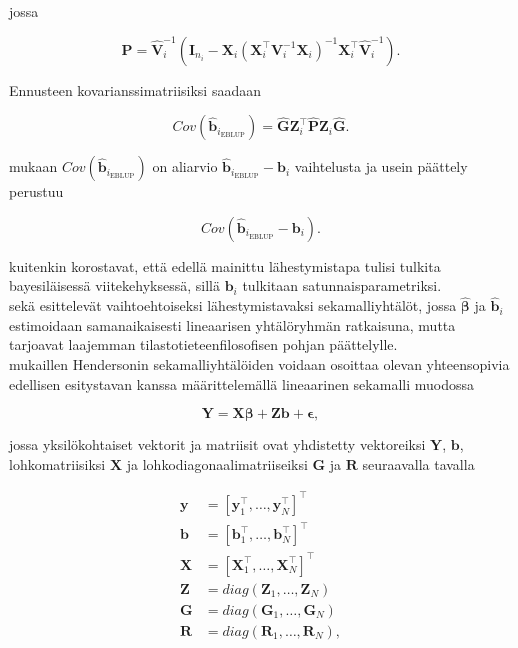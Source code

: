 \documentclass[finnish]{docopts}
\begin{document}
jossa 

$$
\hat{\bm{P}} = \hat{\bm{V}}_{i}^{-1}(\bm{I}_{n_i} - \bm{X}_{i} (\bm{X}_{i}^\top \bm{V}_{i}^{-1} \bm{X}_{i})^{-1} \bm{X}_{i}^\top \hat{\bm{V}}_{i}^{-1}).
$$

Ennusteen kovarianssimatriisiksi saadaan

$$
Cov(\hat{\bm{b}}_{i_\text{EBLUP}}) = \hat{\bm{G}} \bm{Z}_{i}^\top \hat{\bm{P}} \bm{Z}_{i} \hat{\bm{G}}.
$$

\cite{verbeke00} mukaan $Cov(\hat{\bm{b}}_{i_\text{EBLUP}})$ on aliarvio $\hat{\bm{b}}_{i_\text{EBLUP}} - \bm{b}_{i}$ vaihtelusta ja usein päättely perustuu

$$
Cov(\hat{\bm{b}}_{i_\text{EBLUP}} - \bm{b}_{i}).
$$

\cite{verbeke00} kuitenkin korostavat, että edellä mainittu lähestymistapa tulisi tulkita bayesiläisessä viitekehyksessä, sillä $\bm{b}_{i}$ tulkitaan satunnaisparametriksi. \\

\cite{nissinen09} sekä \cite{verbeke00} esittelevät vaihtoehtoiseksi lähestymistavaksi \cite{henderson59} sekamalliyhtälöt, jossa $\hat{\bm{\beta}}$ ja $\hat{\bm{b}}_i$ estimoidaan samanaikaisesti lineaarisen yhtälöryhmän ratkaisuna, mutta \cite{verbeke00} tarjoavat laajemman tilastotieteenfilosofisen pohjan päättelylle.\\

\cite{verbeke00} mukaillen Hendersonin \citeyearpar{henderson59} sekamalliyhtälöiden voidaan osoittaa olevan yhteensopivia edellisen esitystavan kanssa määrittelemällä lineaarinen sekamalli muodossa

$$
\bm{Y} = \bm{X} \bm{\beta} + \bm{Z} \bm{b} + \bm{\epsilon},
$$

jossa yksilökohtaiset vektorit ja matriisit ovat yhdistetty vektoreiksi $\bm{Y}$, $\bm{b}$, lohkomatriisiksi $\bm{X}$ ja lohkodiagonaalimatriiseiksi $\bm{G}$ ja $\bm{R}$ seuraavalla tavalla

$$
\begin{aligned}
\bm{y} &= [\bm{y}_{1}^\top, \dots, \bm{y}_{N}^\top]^\top \\
\bm{b} &= [\bm{b}_{1}^\top, \dots, \bm{b}_{N}^\top]^\top \\
\bm{X} &= [\bm{X}_{1}^\top, \dots, \bm{X}_{N}^\top]^\top \\
\bm{Z} &= diag(\bm{Z}_{1}, \dots, \bm{Z}_{N}) \\
\bm{G} &= diag(\bm{G}_{1}, \dots, \bm{G}_{N}) \\
\bm{R} &= diag(\bm{R}_{1}, \dots, \bm{R}_{N}), \\
\end{aligned}
$$
\end{document}
